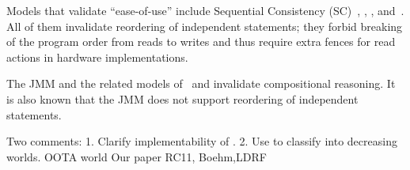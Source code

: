 Models that validate ``ease-of-use'' include Sequential Consistency (SC)~\citet{Lamport:1979:MMC:1311099.1311750}, \citet{Dolan:2018:BDR:3192366.3192421}, \citet{RC11refs}, \citet{DBLP:conf/lics/JeffreyR16} and~\citet{BoehmOOTA}.  All of them invalidate reordering of independent statements; they forbid breaking of the program order from reads to writes and thus require extra fences for read actions in hardware implementations.

The JMM\citet{Manson:2005:JMM:1047659.1040336} and the related models of~\citet{DBLP:conf/esop/JagadeesanPR10} and \citet{DBLP:conf/popl/KangHLVD17} invalidate compositional reasoning.    It is also known that the JMM does not support reordering of independent statements.  

Two comments:
1. Clarify implementability of \citet{DBLP:conf/lics/JeffreyR16}.
2. Use\cite{BoehmOOTA} to 
classify into decreasing worlds.
           OOTA world
              Our paper
                 RC11, Boehm,LDRF






